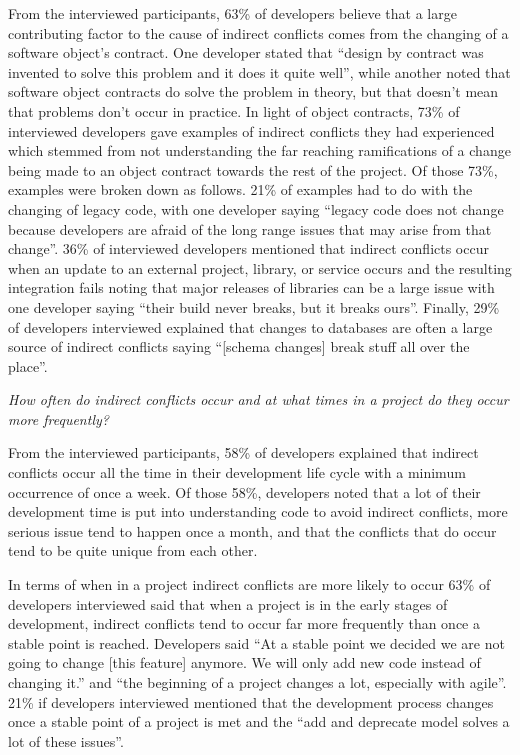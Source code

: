 \documentclass[conference]{IEEEtran}
\begin{document}
From the interviewed participants, 63\% of developers believe that a large contributing factor to the cause
of indirect conflicts comes from the changing of a software object's contract. One developer stated that ``design
by contract was invented to solve this problem and it does it quite well'', while another noted that software 
object contracts do solve the problem in theory, but that doesn't mean that problems don't occur in practice.
In light of object contracts, 73\% of interviewed developers gave examples of indirect conflicts they had experienced
which stemmed from not understanding the far reaching ramifications of a change being made to an object contract
towards the rest of the project. Of those 73\%, examples were broken down as follows. 21\% of examples had to do 
with the changing of legacy code, with one developer saying ``legacy code does not change because developers 
are afraid of the long range issues that may arise from that change''. 36\% of interviewed developers mentioned 
that indirect conflicts occur when an update to an external project, library, or service occurs and the resulting 
integration fails noting that major releases of libraries can be a large issue with one developer saying 
``their build never breaks, but it breaks ours''. Finally, 29\% of developers interviewed explained that changes to
databases are often a large source of indirect conflicts saying ``[schema changes] break stuff all over the place''.

\begin{description}[topsep=6pt]
	\item[RQ2] \textit{How often do indirect conflicts occur and at what times in a project do they occur more frequently?}
\end{description}

From the interviewed participants, 58\% of developers explained that indirect conflicts occur all the time in
their development life cycle with a minimum occurrence of once a week. Of those 58\%, developers noted that a
lot of their development time is put into understanding code to avoid indirect conflicts, more serious issue tend
to happen once a month, and that the conflicts that do occur tend to be quite unique from each other.

In terms of when in a project indirect conflicts are more likely to occur 63\% of developers interviewed said that
when a project is in the early stages of development, indirect conflicts tend to occur far more frequently
than once a stable point is reached. Developers said ``At a stable point we decided we are not going to change
[this feature] anymore. We will only add new code instead of changing it.'' and ``the beginning of a project 
changes a lot, especially with agile''. 21\% if developers interviewed mentioned that the development process
changes once a stable point of a project is met and the ``add and deprecate model solves a lot of these issues''.
\end{document}
